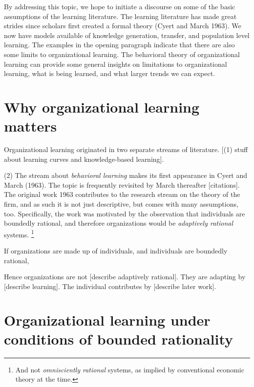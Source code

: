 \documentclass[12pt, man, natbib]{apa6}
\begin{document}
	By addressing this topic, we hope to initiate a discourse on some of the basic assumptions of the learning literature. The learning literature has made great strides since scholars first created a formal theory (Cyert and March 1963). We now have models available of knowledge generation, transfer, and population level learning. The examples in the opening paragraph indicate that there are also some limits to organizational learning. The behavioral theory of organizational learning can provide some general insights on limitations to organizational learning, what is being learned, and what larger trends we can expect.
	
	\section{Why organizational learning matters}
	
	Organizational learning originated in two separate streams of literature. [(1) stuff about learning curves and knowledge-based learning].
	
	(2) The stream about \textit{behavioral learning} makes its first appearance in Cyert and March (1963). The topic is frequently revisited by March thereafter [citations]. The original work 1963 contributes to the research stream on the theory of the firm, and as such it is not just descriptive, but comes with many assumptions, too. Specifically, the work was motivated by the observation that individuals are boundedly rational, and therefore organizations would be \textit{adaptively rational} systems. \footnote{And not \textit{omnisciently rational} systems, as implied by conventional economic theory at the time.}
	
	If organizations are made up of individuals, and individuals are boundedly rational,  
	
	Hence organizations are not [describe adaptively rational]. They are adapting by [describe learning]. The individual contributes by [describe later work].
	
	
	\section{Organizational learning under conditions of bounded rationality}
	
	

%	
%	
	
	


\end{document}
